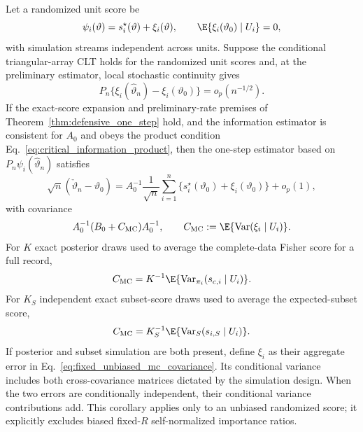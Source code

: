 \begin{theorem}
\label{thm:fixed_unbiased_randomized_score}
Let a randomized unit score be
\[
 \psi_i(\vartheta)=s_i^\star(\vartheta)+\xi_i(\vartheta),
 \qquad
 \E\{\xi_i(\vartheta_0)\mid U_i\}=0,
\]
with simulation streams independent across units.  Suppose the conditional
triangular-array CLT holds for the randomized unit scores and, at the
preliminary estimator, local stochastic continuity gives
\[
 P_n\{\xi_i(\widehat\vartheta_n)-\xi_i(\vartheta_0)\}
 =o_p(n^{-1/2}).
\]
If the exact-score expansion and preliminary-rate premises of
Theorem~\ref{thm:defensive_one_step} hold, and the information estimator is
consistent for $A_0$ and obeys the product condition
Eq.~\eqref{eq:critical_information_product}, then the one-step estimator based
on $P_n\psi_i(\widehat\vartheta_n)$ satisfies
\[
 \sqrt n(\check\vartheta_n-\vartheta_0)
 =A_0^{-1}\frac1{\sqrt n}\sum_{i=1}^n
 \{s_i^\star(\vartheta_0)+\xi_i(\vartheta_0)\}+o_p(1),
\]
with covariance
\begin{equation}
 A_0^{-1}(B_0+C_{\rm MC})A_0^{-1},\qquad
 C_{\rm MC}:=\E\{\operatorname{Var}(\xi_i\mid U_i)\}.
 \label{eq:fixed_unbiased_mc_covariance}
\end{equation}
For $K$ exact posterior draws used to average the complete-data Fisher score
for a full record,
\begin{equation}
 C_{\rm MC}=K^{-1}\E\{\operatorname{Var}_{\pi_i}
 (s_{c,i}\mid U_i)\}.
 \label{eq:exact_posterior_mc_covariance}
\end{equation}
For $K_S$ independent exact subset-score draws used to average the
expected-subset score,
\begin{equation}
 C_{\rm MC}=K_S^{-1}\E\{\operatorname{Var}_{S}
 (s_{i,S}\mid U_i)\}.
 \label{eq:exact_subset_mc_covariance}
\end{equation}
If posterior and subset simulation are both present, define $\xi_i$ as their
aggregate error in Eq.~\eqref{eq:fixed_unbiased_mc_covariance}.  Its conditional
variance includes both cross-covariance matrices dictated by the simulation
design.  When the two errors are conditionally independent, their conditional
variance contributions add.  This corollary applies only to an unbiased
randomized score; it explicitly excludes biased fixed-$R$ self-normalized
importance ratios.
\end{theorem}

